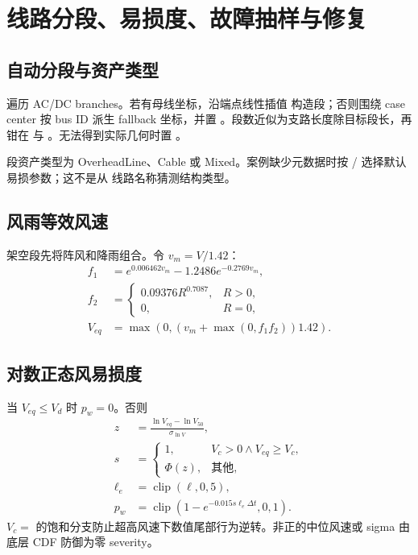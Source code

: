 \section{线路分段、易损度、故障抽样与修复}
\label{sec:fragility-fault-repair}

\subsection{自动分段与资产类型}
 遍历 AC/DC branches。若有母线坐标，沿端点线性插值
构造段；否则围绕 case center 按 bus ID 派生 fallback 坐标，并置
。段数近似为支路长度除目标段长，再钳在
 与 。无法得到实际几何时置
。

段资产类型为 OverheadLine、Cable 或 Mixed。案例缺少元数据时按
 /  选择默认易损参数；这不是从
线路名称猜测结构类型。

\subsection{风雨等效风速}
架空段先将阵风和降雨组合。令 $v_m=V/1.42$：
\begin{align}
 f_1&=e^{0.006462v_m}-1.2486e^{-0.2769v_m},\\
 f_2&=\begin{cases}0.09376R^{0.7087},&R>0,\\0,&R=0,\end{cases}\\
 V_{eq}&=\max(0,(v_m+\max(0,f_1f_2))1.42).
\end{align}

\subsection{对数正态风易损度}
当 $V_{eq}\le V_d$ 时 $p_w=0$。否则
\begin{align}
 z&=\frac{\ln V_{eq}-\ln V_{50}}{\sigma_{\ln V}},\\
 s&=\begin{cases}
 1,&V_c>0\land V_{eq}\ge V_c,\\
 \Phi(z),&\text{其他},
 \end{cases}\\
 \ell_e&=\operatorname{clip}(\ell,0,5),\\
 p_w&=\operatorname{clip}\left(1-e^{-0.015s\ell_e\Delta t},0,1\right).
\end{align}
$V_c=$ 的饱和分支防止超高风速下数值尾部行为逆转。非正的中位风速或
sigma 由底层 CDF 防御为零 severity。

